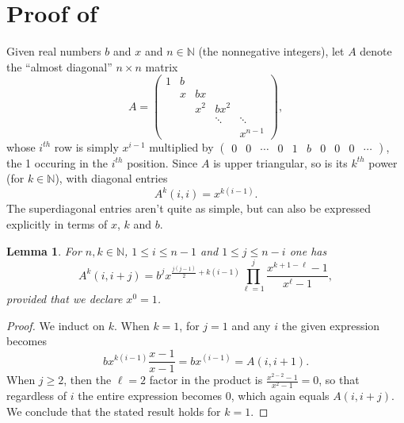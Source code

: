 \documentclass[9pt,lineno]{elife}
\newtheorem{lemma}{Lemma}
\newcommand{\N}{\mathbb{N}}
\begin{document}
\appendix
\begin{appendixbox}
\label{app:proof}
\section{Proof of }
Given real numbers $b$ and $x$ and $n \in \N$ (the nonnegative integers), let $A$ denote the ``almost diagonal'' $n \times n$ matrix
\[
A = \left( \begin{array}{ccccc} 1 & b \\ & x & bx \\ & & x^2 & bx^2 \\ & & & \ddots & \ddots \\ & & & & x^{n-1} \end{array} \right),
\]
whose $i^{th}$ row is simply $x^{i-1}$ multiplied by $( \begin{array}{cccccccccc} 0 & 0 & \cdots & 0 & 1 & b & 0 & 0 & 0 & \cdots \end{array} )$, the 1 occuring in the $i^{th}$ position.  Since $A$ is upper triangular, so is its $k^{th}$ power (for $k \in \N$), with diagonal entries
\[
A^k(i,i) = x^{k(i-1)}.
\]
The superdiagonal entries aren't quite as simple, but can also be expressed explicitly in terms of $x$, $k$ and $b$.

\begin{lemma}\label{main}
For $n, k \in \N$, $1 \le i \le n-1$ and $1 \le j \le n-i$ one has
\[
A^k(i,i+j) = b^j x^{\frac{j(j-1)}{2} + k(i-1)} \prod_{\ell = 1}^{j} \frac{x^{k+1- \ell} - 1}{x^{\ell} - 1},
\]
provided that we declare $x^0 = 1$.  
\end{lemma}

\begin{proof}
We induct on $k$.  When $k=1$, for $j=1$ and any $i$ the given expression becomes
\[
bx^{k(i-1)} \frac{x-1}{x-1} = bx^{(i-1)} = A(i,i+1).
\]
When $j \ge 2$, then the $\ell = 2$ factor in the product is $\frac{x^{2-2}-1}{x^2-1}=0$, so that regardless of $i$ the entire expression becomes $0$, which again equals $A(i,i+j)$.  We conclude that the stated result holds for $k=1$.


\end{proof}
\end{appendixbox}
\end{document}
